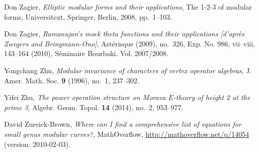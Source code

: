 \documentclass{gtpart}
\theoremstyle{definition}
\theoremstyle{remark}
\renewcommand{\=}{\approx}
\renewcommand{\-}{\sim}
\numberwithin{equation}{section}
\begin{document}
\begin{thebibliography}
Don Zagier, \emph{Elliptic modular forms and their applications}, The 1-2-3 of
  modular forms, Universitext, Springer, Berlin, 2008, pp.~1--103. 

Don Zagier, \emph{Ramanujan's mock theta functions and their applications
  [d'apr\`es {Z}wegers and {B}ringmann-{O}no]}, Ast\'erisque (2009), no.~326,
  Exp. No. 986, vii--viii, 143--164 (2010), S{\'e}minaire Bourbaki. Vol.
  2007/2008. 

Yongchang Zhu, \emph{Modular invariance of characters of vertex operator
  algebras}, J. Amer. Math. Soc. \textbf{9} (1996), no.~1, 237--302.

Yifei Zhu, \emph{The power operation structure on {M}orava {$E$}-theory of
  height 2 at the prime 3}, Algebr. Geom. Topol. \textbf{14} (2014), no.~2,
  953--977. 

David Zureick-Brown,
  \emph{Where can {I} find a comprehensive list of equations for small genus
  modular curves?}, MathOverflow, \href{http://mathoverflow.net/q/14054}
  {http://mathoverflow.net/q/14054} (version: 2010-02-03).

\end{thebibliography}
\end{document}

